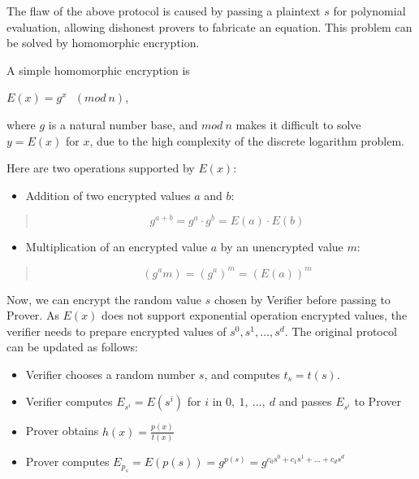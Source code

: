\documentclass[
]{report}
\providecommand{\tightlist}{%
  \setlength{\itemsep}{0pt}\setlength{\parskip}{0pt}}
\begin{document}
The flaw of the above protocol is caused by passing a plaintext \(s\)
for polynomial evaluation, allowing dishonest provers to fabricate an
equation. This problem can be solved by homomorphic encryption.

A simple homomorphic encryption is

\(E(x) = g^{x}\ \ \ (mod\ n)\),

where \(g\) is a natural number base, and \(mod\ n\) makes it difficult
to solve \(y = E(x)\) for \(x\), due to the high complexity of the
discrete logarithm problem.

Here are two operations supported by \(E(x)\):

\begin{itemize}
\tightlist
\item
  Addition of two encrypted values \(a\) and \(b\):
\end{itemize}

\begin{quote}
\[g^{a + b} = g^{a} \cdot g^{b} = E(a) \cdot E(b)\]
\end{quote}

\begin{itemize}
\tightlist
\item
  Multiplication of an encrypted value \(a\) by an unencrypted value
  \(m\):
\end{itemize}

\begin{quote}
\[\left( g^{a}m \right) = \left( g^{a} \right)^{m} = \left( E(a) \right)^{m}\]
\end{quote}

Now, we can encrypt the random value \(s\) chosen by Verifier before
passing to Prover. As \(E(x)\) does not support exponential operation
encrypted values, the verifier needs to prepare encrypted values of
\(s^{0},s^{1},\ldots,s^{d}\). The original protocol can be updated as
follows:

\begin{itemize}
\item
  Verifier chooses a random number \(s\), and computes \(t_{s} = t(s)\).
\item
  Verifier computes \(E_{s^{i}} = E\left( s^{i} \right)\) for \(i\) in
  \(0,\ 1,\ \ldots,\ d\) and passes \(E_{s^{i}}\) to Prover
\item
  Prover obtains \(h(x) = \frac{p(x)}{t(x)}\)
\item
  Prover computes
  \(E_{p_{s}} = E\left( p(s) \right) = g^{p(s)} = g^{c_{0}s^{0} + c_{1}s^{1} + \ldots + c_{d}s^{d}}\)
\end{itemize}
\end{document}
